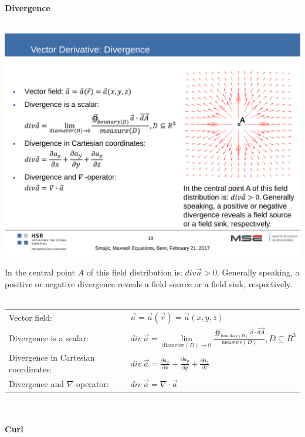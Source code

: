 \textbf{\\ \\ Divergence\\ \\}
\begin{minipage}[lt]{5cm}
	\includegraphics[width=.8\textwidth]{./images/Divergence.pdf}
\end{minipage}
\begin{minipage}[rt]{13cm}
	In the central point $A$ of this field distribution is: $div \vec{a} > 0$. Generally speaking, a positive or negative divergence reveals a field source or a field sink, respectively. \\ \\
	\begin{tabular}{ll}
		Vector field: & \(\displaystyle \vec{a} = \vec{a}\left(\vec{r}\right) = \vec{a}\left(x,y,z\right)\) \\
		Divergence is a scalar: & \(\displaystyle div~\vec{a} = \lim\limits_{\textrm{diameter}\left(D\right)\rightarrow 0} \frac{\oiint_{\textrm{boundary}\left(D\right)} \vec{a} \cdot \vec{dA}}{\textrm{measure}\left(D\right)}, D\subseteq R^3\) \\
		Divergence in Cartesian coordinates: & \(\displaystyle div~\vec{a} = \frac{\partial a_x}{\partial x} + \frac{\partial a_y}{\partial y} + \frac{\partial a_z}{\partial z} \)\\
		Divergence and $\nabla$-operator: & \(\displaystyle div~\vec{a} = \nabla \cdot \vec{a} \) \\
	\end{tabular}
\end{minipage}
\newpage
\textbf{\\ \\ Curl\\ \\}
